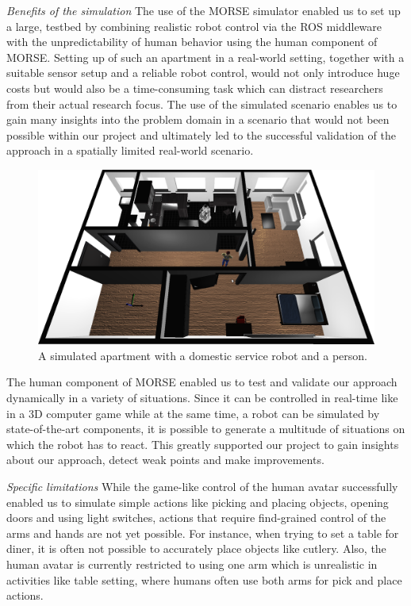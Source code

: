 \documentclass[conference]{IEEEtran}
\begin{document}
\emph{Benefits of the simulation} The use of the MORSE simulator enabled us to set up a large, 
testbed by combining realistic robot control via the ROS middleware with the
unpredictability of human behavior using the human component of MORSE. Setting
up of such an apartment in a real-world setting, together with a suitable
sensor setup and a reliable robot control, would not only introduce huge costs
but would also be a time-consuming task which can distract researchers from
their actual research focus. The use of the simulated scenario enables us to
gain many insights into the problem domain in a scenario that would not been
possible within our project and ultimately led to the successful validation of
the approach in a spatially limited real-world scenario.

\begin{figure}[H]
      \centering
      \includegraphics[width=0.9\linewidth]{morse_apartment.png}
      \caption{A simulated apartment with a domestic service robot and a person.}
      \label{fig|apartment}
\end{figure}

The human component of MORSE enabled us to test and validate our approach
dynamically in a variety of situations. Since it can be controlled in real-time
like in a 3D computer game while at the same time, a robot can be simulated by
state-of-the-art components, it is possible to generate a multitude of
situations on which the robot has to react. This greatly supported our project
to gain insights about our approach, detect weak points and make improvements.

\emph{Specific limitations} While the game-like control of the human avatar 
successfully enabled us to simulate simple actions like picking and placing objects, 
opening doors and using light switches, actions that require find-grained control 
of the arms and hands are not yet possible. For instance, when trying to set a table for 
diner, it is often not possible to accurately place objects like cutlery. Also, the human
avatar is currently restricted to using one arm which is unrealistic in activities 
like table setting, where humans often use both arms for pick and place actions.
 
\end{document}
